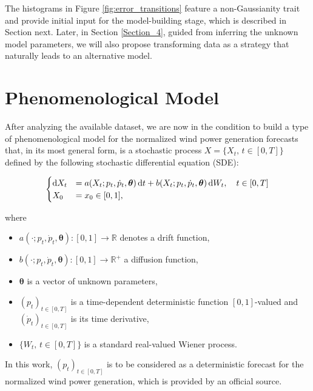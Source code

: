 \documentclass[11pt]{article}
\theoremstyle{definition}
\begin{document}
The histograms in Figure \ref{fig:error_transitions} feature a non-Gaussianity trait and provide initial input for the model-building stage, which is described in Section next.
Later, in Section \ref{Section_4}, guided from inferring the unknown model parameters, we will also propose transforming data as a strategy that naturally leads to an alternative model.



\section{Phenomenological  Model} \label{Section_3}

After analyzing the available dataset, we are now in the condition to build a type of phenomenological model for the normalized wind power generation forecasts that, in its most general form, is a stochastic process $X = \{X_t, \, t \in [0, T] \}$  defined by the following stochastic differential equation (SDE):

\begin{equation}
\begin{cases}
    \dif X_t &=  a(X_t; p_t, \dot{p}_t,\bm{\theta})\dif t + b (X_t; p_t, \dot{p}_t, \bm{\theta} )\dif W_t, \quad t \in [0,T]  \\
     X_0  &=  x_0 \in [0,1],
\end{cases}
 \label{eq:main}
\end{equation} 

where

\begin{itemize}
\item $a(\cdot; p_t, \dot{p}_t, \bm{\theta}): [0,1] \to \mathbb{R} $  denotes a drift function,
\item $b(\cdot; p_t, \dot{p}_t, \bm{\theta}): [0,1] \to \mathbb{R}^+ $  a  diffusion function,
\item $\bm{\theta}$ is a vector of unknown parameters,
\item $(p_t)_{t \in [0,T]}$ is a time-dependent deterministic function $[0,1]$-valued and $ (\dot{p}_t)_{t \in [0,T]}$ is its time derivative,
\item $\{W_t, \, t \in [0,T] \}$ is a standard real-valued Wiener process.
\end{itemize}

In this work, $(p_t)_{t \in [0,T]}$ is to be considered as a deterministic forecast for the normalized wind power generation, which is provided by an official source. 
\end{document}
